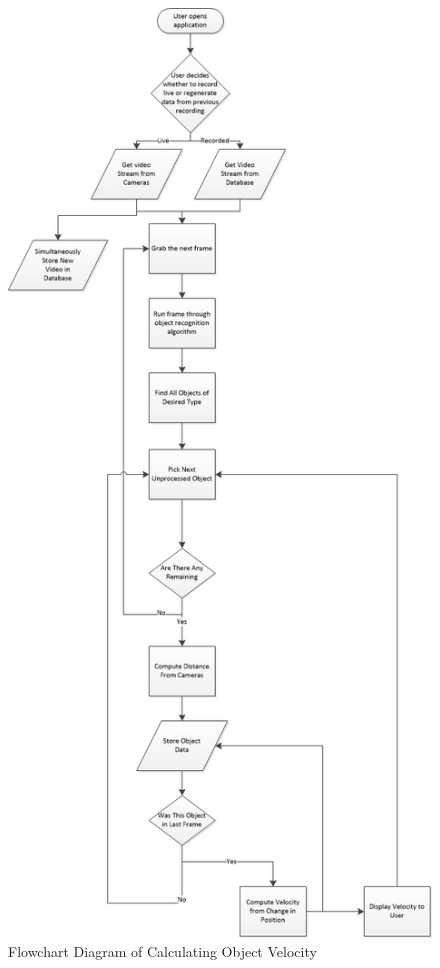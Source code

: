 \documentclass[letterpaper,10pt,onecolumn,draftclsnofoot]{IEEEtran}
\begin{document}
\begin{figure}[H]
\includegraphics[scale=.68]{flowchart}
\caption{Flowchart Diagram of Calculating Object Velocity}
\label{fig:flowchart}
\end{figure}
\end{document}

